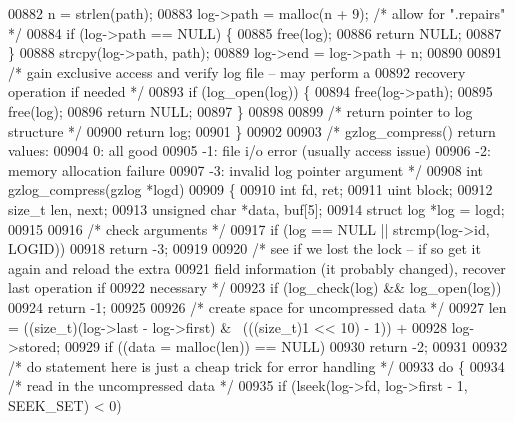 \begin{DoxyCode}
{00882     n = strlen(path);
00883     log->path = malloc(n + 9);              \textcolor{comment}{/* allow for ".repairs" */}
00884     \textcolor{keywordflow}{if} (log->path == NULL) \{
00885         free(log);
00886         \textcolor{keywordflow}{return} NULL;
00887     \}
00888     strcpy(log->path, path);
00889     log->end = log->path + n;
00890 
00891     \textcolor{comment}{/* gain exclusive access and verify log file -- may perform a}
00892 \textcolor{comment}{       recovery operation if needed */}
00893     \textcolor{keywordflow}{if} (log\_open(log)) \{
00894         free(log->path);
00895         free(log);
00896         \textcolor{keywordflow}{return} NULL;
00897     \}
00898 
00899     \textcolor{comment}{/* return pointer to log structure */}
00900     \textcolor{keywordflow}{return} log;
00901 \}
00902 
00903 \textcolor{comment}{/* gzlog\_compress() return values:}
00904 \textcolor{comment}{    0: all good}
00905 \textcolor{comment}{   -1: file i/o error (usually access issue)}
00906 \textcolor{comment}{   -2: memory allocation failure}
00907 \textcolor{comment}{   -3: invalid log pointer argument */}
00908 \textcolor{keywordtype}{int} gzlog\_compress(gzlog *logd)
00909 \{
00910     \textcolor{keywordtype}{int} fd, ret;
00911     uint block;
00912     \textcolor{keywordtype}{size\_t} len, next;
00913     \textcolor{keywordtype}{unsigned} \textcolor{keywordtype}{char} *data, buf[5];
00914     \textcolor{keyword}{struct }log *log = logd;
00915 
00916     \textcolor{comment}{/* check arguments */}
00917     \textcolor{keywordflow}{if} (log == NULL || strcmp(log->id, LOGID))
00918         \textcolor{keywordflow}{return} -3;
00919 
00920     \textcolor{comment}{/* see if we lost the lock -- if so get it again and reload the extra}
00921 \textcolor{comment}{       field information (it probably changed), recover last operation if}
00922 \textcolor{comment}{       necessary */}
00923     \textcolor{keywordflow}{if} (log\_check(log) && log\_open(log))
00924         \textcolor{keywordflow}{return} -1;
00925 
00926     \textcolor{comment}{/* create space for uncompressed data */}
00927     len = ((size\_t)(log->last - log->first) & ~(((size\_t)1 << 10) - 1)) +
00928           log->stored;
00929     \textcolor{keywordflow}{if} ((data = malloc(len)) == NULL)
00930         \textcolor{keywordflow}{return} -2;
00931 
00932     \textcolor{comment}{/* do statement here is just a cheap trick for error handling */}
00933     \textcolor{keywordflow}{do} \{
00934         \textcolor{comment}{/* read in the uncompressed data */}
00935         \textcolor{keywordflow}{if} (lseek(log->fd, log->first - 1, SEEK\_SET) < 0)
}
\end{DoxyCode}
